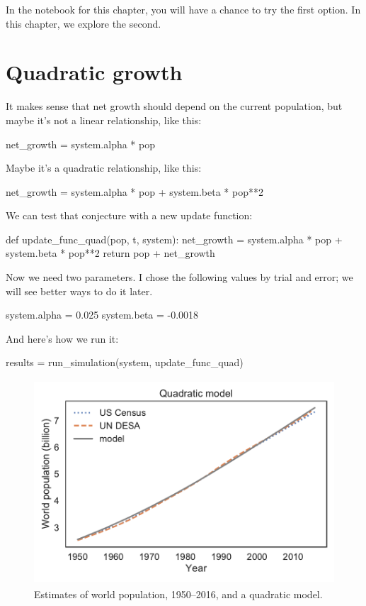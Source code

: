 \documentclass[12pt]{book}
\theoremstyle{exercise}
\begin{document}
In the notebook for this chapter, you will have a chance to try the first option.  In this chapter, we explore the second.


\section{Quadratic growth}
\label{quadratic}

It makes sense that net growth should depend on the current population, but maybe it's not a linear relationship, like this:

\begin{python}
    net_growth = system.alpha * pop
\end{python}

Maybe it's a quadratic relationship, like this:


\begin{python}
    net_growth = system.alpha * pop + system.beta * pop**2
\end{python}

We can test that conjecture with a new update function:

\begin{python}
def update_func_quad(pop, t, system):
    net_growth = system.alpha * pop + system.beta * pop**2
    return pop + net_growth
\end{python}

Now we need two parameters.  I chose the following values by trial and error; we will see better ways to do it later.


\begin{python}
system.alpha = 0.025
system.beta = -0.0018
\end{python}

And here's how we run it:

\begin{python}
results = run_simulation(system, update_func_quad)
\end{python}

\begin{figure}
\centerline{\includegraphics[height=3in]{figs/chap07-fig01.pdf}}
\caption{Estimates of world population, 1950--2016, and a quadratic model.}
\label{chap07-fig01}
\end{figure}
\end{document}
